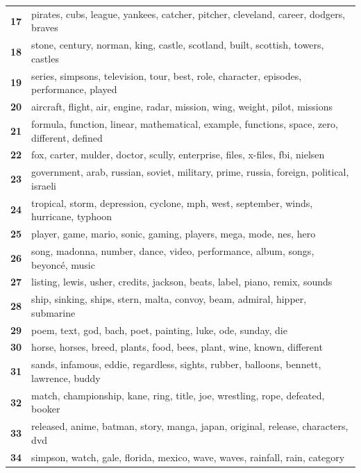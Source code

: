 \begin{table}[htpb]
\begin{tabularx}{\textwidth}{@{}l X@{}}
        \textbf{17} & pirates, cubs, league, yankees, catcher, pitcher, cleveland, career, dodgers, braves \\
        \textbf{18} & stone, century, norman, king, castle, scotland, built, scottish, towers, castles \\
        \textbf{19} & series, simpsons, television, tour, best, role, character, episodes, performance, played \\
        \textbf{20} & aircraft, flight, air, engine, radar, mission, wing, weight, pilot, missions \\
        \textbf{21} & formula, function, linear, mathematical, example, functions, space, zero, different, defined \\
        \textbf{22} & fox, carter, mulder, doctor, scully, enterprise, files, x-files, fbi, nielsen \\
        \textbf{23} & government, arab, russian, soviet, military, prime, russia, foreign, political, israeli \\
        \textbf{24} & tropical, storm, depression, cyclone, mph, west, september, winds, hurricane, typhoon \\
        \textbf{25} & player, game, mario, sonic, gaming, players, mega, mode, nes, hero \\
        \textbf{26} & song, madonna, number, dance, video, performance, album, songs, beyoncé, music \\
        \textbf{27} & listing, lewis, usher, credits, jackson, beats, label, piano, remix, sounds \\
        \textbf{28} & ship, sinking, ships, stern, malta, convoy, beam, admiral, hipper, submarine \\
        \textbf{29} & poem, text, god, bach, poet, painting, luke, ode, sunday, die \\
        \textbf{30} & horse, horses, breed, plants, food, bees, plant, wine, known, different \\
        \textbf{31} & sands, infamous, eddie, regardless, sights, rubber, balloons, bennett, lawrence, buddy \\
        \textbf{32} & match, championship, kane, ring, title, joe, wrestling, rope, defeated, booker \\
        \textbf{33} & released, anime, batman, story, manga, japan, original, release, characters, dvd \\
        \textbf{34} & simpson, watch, gale, florida, mexico, wave, waves, rainfall, rain, category \\

\end{tabularx}
\end{table}
